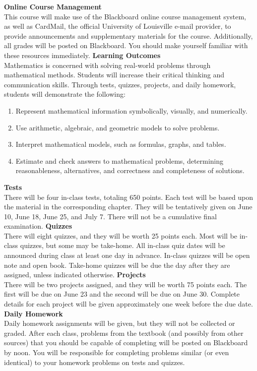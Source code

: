 \documentclass[addpoints,12pt]{exam}
\begin{document}
\noindent \textbf{Online Course Management} \\
This course will make use of the Blackboard online course management system, as well as CardMail, the official University of Louisville e-mail provider, to provide announcements and supplementary materials for the course. Additionally, all grades will be posted on Blackboard. You should make yourself familiar with these resources immediately.
\wl
\noindent \textbf{Learning Outcomes} \\
Mathematics is concerned with solving real-world problems through mathematical methods.  Students will increase their critical thinking and communication skills. Through tests, quizzes, projects, and daily homework, students will demonstrate the following:
\begin{enumerate} \itemsep10pt \parskip-6pt 
\item Represent mathematical information symbolically, visually, and numerically.
\item Use arithmetic, algebraic, and geometric models to solve problems.
\item Interpret mathematical models, such as formulas, graphs, and tables.
\item Estimate and check answers to mathematical problems, determining reasonableness, alternatives, and correctness and completeness of solutions.
\end{enumerate}
\newpage



\noindent \textbf{Tests} \\
There will be four in-class tests, totaling 650 points. Each test will be based upon the material in the corresponding chapter. They will be tentatively given on June 10, June 18, June 25, and July 7. There will not be a cumulative final examination.
\wl
\noindent \textbf{Quizzes} \\
There will eight quizzes, and they will be worth 25 points each. Most will be in-class quizzes, but some may be take-home. All in-class quiz dates will be announced during class at least one day in advance. In-class quizzes will be open note and open book. Take-home quizzes will be due the day after they are assigned, unless indicated otherwise.
\wl
\noindent \textbf{Projects} \\
There will be two projects assigned, and they will be worth 75 points each. The first will be due on June 23 and the second will be due on June 30. Complete details for each project will be given approximately one week before the due date.
\wl
\noindent \textbf{Daily Homework} \\
Daily homework assignments will be given, but they will not be collected or graded. After each class, problems from the textbook (and possibly from other sources) that you should be capable of completing will be posted on Blackboard by noon. You will be responsible for completing problems similar (or even identical) to your homework problems on tests and quizzes.
\end{document}
